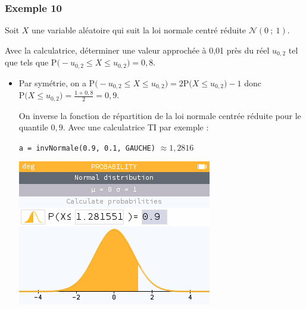 \documentclass[xcolor=svgnames,t,final]{beamer}
\newcommand{\loinorm}[2]{\mathcal{N}\left(#1\ ; \ #2 \right)}
\newcommand{\proba}[1]{\text{P}\big(#1\big)}
\begin{document}
\begin{frame}
\frametitle{Exemple 10}
\label{exemple10}

Soit $X$ une variable aléatoire qui suit la loi normale centré réduite $\loinorm{0}{1}$.

Avec la calculatrice, déterminer une valeur approchée à 0,01 près du réel $u_{0,2}$ tel que  tels que $\proba{ -u_{0,2} \leqslant X \leqslant u_{0,2}}=0,8$.

\begin{itemize}

\pause \item Par symétrie, on a $\proba{ -u_{0,2} \leqslant X \leqslant u_{0,2}} = 2\proba{X \leqslant u_{0,2}}-1$ donc $\proba{X \leqslant u_{0,2}}=\frac{1+0,8}{2}=0,9$.

On inverse la fonction de répartition de la loi normale centrée réduite pour le quantile $0,9$. Avec une calculatrice TI par exemple : 

 \texttt{a = invNormale(0.9, 0.1, GAUCHE)} $\approx 1,2816$

\begin{center}
\includegraphics[scale=0.3]{images/exemple9-fig4.png}
\end{center}
\end{itemize}



\

\end{frame}
\end{document}
